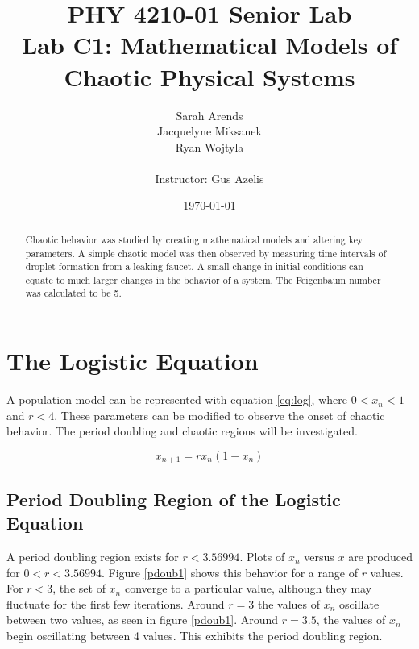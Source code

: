 \documentclass[a4paper]{article}
\begin{document}
\title{PHY 4210-01 Senior Lab \\Lab C1:  Mathematical Models of Chaotic Physical Systems }

\author{Sarah Arends \\
        Jacquelyne Miksanek \\
        Ryan Wojtyla \\ \\
        Instructor: Gus Azelis}

\date{\today}


\maketitle

\begin{abstract}
\qq Chaotic behavior was studied by creating mathematical models and altering key parameters. A simple chaotic model was then observed by measuring time intervals of droplet formation from a leaking faucet. A small change in initial conditions can equate to much larger changes in the behavior of a system. The Feigenbaum number was calculated to be 5.

\end{abstract}

\newpage

\tableofcontents

\newpage

\section{The Logistic Equation}
\qq A population model can be represented with equation \ref{eq:log}, where $0<x_n<1$ and $r<4$. These parameters can be modified to observe the onset of chaotic behavior. The period doubling and chaotic regions will be investigated.

\begin{equation}
x_{n+1} = r x_n (1-x_n)
\label{eq:log}
\end{equation}

\subsection{Period Doubling Region of the Logistic Equation}
\qq A period doubling region exists for $r<3.56994$. Plots of $x_n$ versus $x$ are produced for $0<r<3.56994$. Figure \ref{pdoub1} shows this behavior for a range of $r$ values. For $r<3$, the set of $x_n$ converge to a particular value, although they may fluctuate for the first few iterations. Around $r=3$ the values of $x_n$ oscillate between two values, as seen in figure \ref{pdoub1}. Around $r=3.5$, the values of $x_n$ begin oscillating between 4 values. This exhibits the period doubling region.
\end{document}

